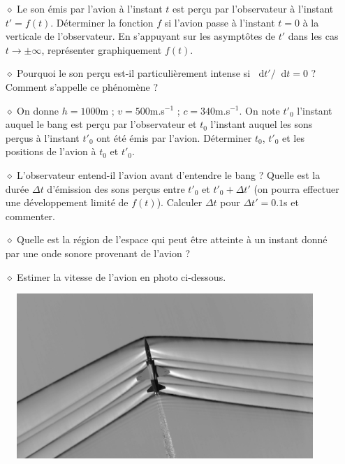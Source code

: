 \documentclass{report}
\newcommand*\dif{\mathop{}\!\mathrm{d}}
\begin{document}
\begin{itemize}

	\item[$\diamond$] Le son émis par l'avion à l'instant $t$ est perçu par l'observateur à l'instant $t'=f(t)$. Déterminer la fonction $f$ si l'avion passe à l'instant $t=0$ à la verticale de l'observateur. En s'appuyant sur les asymptôtes de $t'$ dans les cas $t\longrightarrow\pm\infty$, représenter graphiquement $f(t)$.
	
	\item[$\diamond$]  Pourquoi le son perçu est-il particulièrement intense si $\dif t'/\dif t=0$ ? Comment s'appelle ce phénomène ? 
	
	\item[$\diamond$]  On donne $h=1000$m ; $v=500$m.s$^{-1}$ ; $c=340$m.s$^{-1}$. On note $t'_0$ l'instant auquel le bang est perçu par l'observateur et $t_0$ l'instant auquel les sons perçus à l'instant $t'_0$ ont été émis par l'avion. Déterminer $t_0$, $t'_0$ et les positions de l'avion à $t_0$ et $t'_0$. 
	
	\item[$\diamond$] L'observateur entend-il l'avion avant d'entendre le bang ? Quelle est la durée $\Delta t$ d'émission des sons perçus entre $t'_0$ et $t'_0+\Delta t'$ (on pourra effectuer une développement limité de $f(t)$). Calculer $\Delta t$ pour $\Delta t'=0.1$s et commenter.
	
	\item[$\diamond$] Quelle est la région de l'espace qui peut être atteinte à un instant donné par une onde sonore provenant de l'avion ?
	
	\item[$\diamond$] Estimer la vitesse de l'avion en photo ci-dessous.  

\end{itemize}

\begin{figure}[h!]
\centering
		\includegraphics[scale=0.10]{avion.jpg}
\end{figure}
\end{document}
